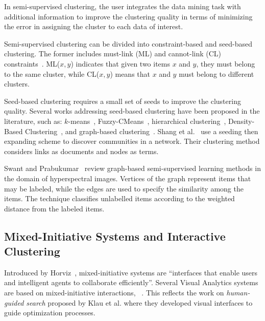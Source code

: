 In semi-supervised clustering, the user integrates the data mining task with additional information to improve the clustering quality in terms of minimizing the error in assigning the cluster to each data of interest.

Semi-supervised clustering can be divided into constraint-based and seed-based clustering.
The former includes must-link (ML) and cannot-link (CL) constraints~\cite{basuConstrainedClusteringAdvances2008, wagstaff2001constrained}. ML($x,y$) indicates that given two items $x$ and $y$, they must belong to the same cluster, while CL($x,y$) means that $x$ and $y$ must belong to different clusters.

Seed-based clustering requires a small set of seeds to improve the clustering quality. Several works addressing seed-based clustering have been proposed in the literature, such as: $k$-means~\cite{basuConstrainedClusteringAdvances2008}, Fuzzy-CMeans~\cite{bensaidPartiallySupervisedClustering1996}, hierarchical clustering~\cite{bohm08}, Density-Based Clustering~\cite{lelisSemisupervisedDensityBasedClustering2009}, and graph-based clustering~\cite{wagstaff2001constrained}.
Shang et al.~\cite{shangEfficientlyDetectingOverlapping2017} use a seeding then expanding scheme to discover communities in a network. Their clustering method considers links as documents and nodes as terms.

Swant and Prabukumar~\cite{SAWANT2018} review graph-based semi-supervised learning methods in the domain of hyperspectral images.
Vertices of the graph represent items that may be labeled, while the edges are used to specify the similarity among the items.
The technique classifies unlabelled items according to the weighted distance from the labeled items.

\subsection{Mixed-Initiative Systems and Interactive Clustering}

Introduced by Horviz~\cite{horvitzPrinciplesMixedinitiativeUser1999}, mixed-initiative systems are ``interfaces that enable users and intelligent agents to collaborate efficiently''. Several Visual Analytics systems are based on mixed-initiative interactions, \eg~\cite{makoninMixedInitiativeBigData2016, cookMixedinitiativeVisualAnalytics2015, zhou13, wallPodiumRankingData2018}.
This reflects the work on \textit{human-guided search} proposed by Klau et al.\cite{klauHuGSPlatformToolkit2002} where they developed visual interfaces to guide optimization processes.

